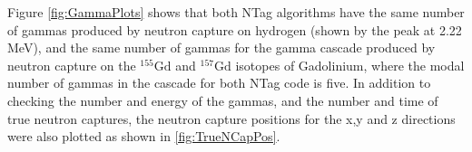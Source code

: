 Figure \ref{fig:GammaPlots} shows that both NTag algorithms have the same number of gammas produced by neutron capture on hydrogen (shown by the peak at 2.22 MeV), and the same number of gammas for the gamma cascade produced by neutron capture on the ${ }^{155} \mathrm{Gd}$ and 
${ }^{157} \mathrm{Gd}$ isotopes of Gadolinium, where the modal number of gammas in the cascade for both NTag code is five. In addition to checking the number and energy of the gammas, and the number and time of true neutron captures, the neutron capture positions for the x,y and z directions were also plotted as shown in \ref{fig:TrueNCapPos}.

\begin{figure}
\centering
    \begin{minipage}{0.5\linewidth}
    \end{minipage}%
    \begin{minipage}{0.5\linewidth}
    \centering

\end{minipage}
\end{figure}
